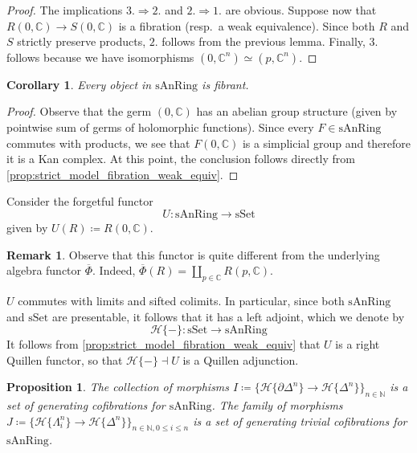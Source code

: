 \documentclass[12pt,a4paper,reqno]{amsart}
\theoremstyle{plain}
\newtheorem{prop}[thm]{Proposition}
\newtheorem{cor}[thm]{Corollary}
\theoremstyle{definition}
\newtheorem{rem}[thm]{Remark}
\theoremstyle{remark}
\numberwithin{equation}{section}
\begin{document}
\begin{proof}
	The implications $3. \Rightarrow 2.$ and $2. \Rightarrow 1.$ are obvious.
	Suppose now that $R(0, \mathbb C) \to S(0, \mathbb C)$ is a fibration (resp.\ a weak equivalence).
	Since both $R$ and $S$ strictly preserve products, $2.$ follows from the previous lemma.
	Finally, $3.$ follows because we have isomorphisms $(0, \mathbb C^n) \simeq (p, \mathbb C^n)$.
\end{proof}

\begin{cor} \label{cor:strict_model_every_object_is_fibrant}
	Every object in $\mathrm{sAnRing}$ is fibrant.
\end{cor}

\begin{proof}
	Observe that the germ $(0, \mathbb C)$ has an abelian group structure (given by pointwise sum of germs of holomorphic functions).
	Since every $F \in \mathrm{sAnRing}$ commutes with products, we see that $F(0, \mathbb C)$ is a simplicial group and therefore it is a Kan complex.
	At this point, the conclusion follows directly from \cref{prop:strict_model_fibration_weak_equiv}.
\end{proof}

Consider the forgetful functor
\[ U \colon \mathrm{sAnRing} \to {\mathrm{sSet}} \]
given by $U(R) \coloneqq R(0, \mathbb C)$.

\begin{rem}
	Observe that this functor is quite different from the underlying algebra functor $\overline{\Phi}$.
	Indeed, $\overline{\Phi}(R) = \coprod_{p \in \mathbb C} R(p, \mathbb C)$.
\end{rem}

$U$ commutes with limits and sifted colimits. In particular, since both $\mathrm{sAnRing}$ and ${\mathrm{sSet}}$ are presentable, it follows that it has a left adjoint, which we denote by
\[ {\mathcal H}\{-\} \colon {\mathrm{sSet}} \to \mathrm{sAnRing} \]
It follows from \cref{prop:strict_model_fibration_weak_equiv} that $U$ is a right Quillen functor, so that ${\mathcal H}\{-\} \dashv U$ is a Quillen adjunction.

\begin{prop}
	The collection of morphisms $I \coloneqq \{{\mathcal H}\{\partial \Delta^n\} \to {\mathcal H}\{\Delta^n\}\}_{n \in \mathbb N}$ is a set of generating cofibrations for $\mathrm{sAnRing}$.
	The family of morphisms $J \coloneqq \{{\mathcal H}\{\Lambda^n_i\} \to {\mathcal H}\{\Delta^n\}\}_{n \in \mathbb N, 0 \le i \le n}$ is a set of generating trivial cofibrations for $\mathrm{sAnRing}$.
\end{prop}
\end{document}
